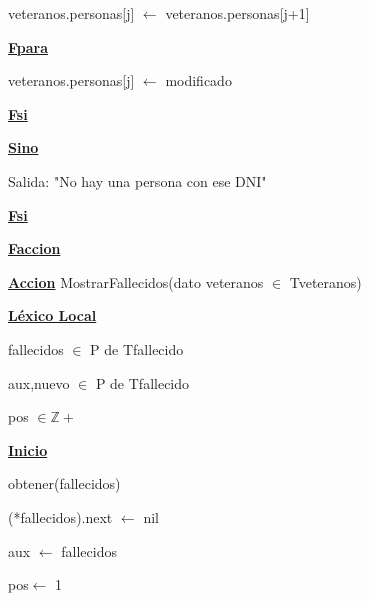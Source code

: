 \documentclass{article}
\begin{document}
                        \hspace{24mm}veteranos.personas[j] $\leftarrow$ veteranos.personas[j+1]

                    \hspace{20mm}\underline{\textbf{Fpara}}
                    
                    \hspace{20mm}veteranos.personas[j] $\leftarrow$ modificado

                \hspace{16mm}\underline{\textbf{Fsi}}

            \hspace{12mm}\underline{\textbf{Sino}}

                \hspace{16mm}Salida: "No hay una persona con ese DNI"

            \hspace{12mm}\underline{\textbf{Fsi}}

    \hspace{4mm}\underline{\textbf{Faccion}}

    \vspace{4mm}

    \hspace{4mm}\underline{\textbf{Accion}} MostrarFallecidos(dato veteranos $\in$ Tveteranos)

        \hspace{8mm}\underline{\textbf{Léxico Local}}

            \hspace{12mm}fallecidos $\in$ P de Tfallecido

            \hspace{12mm}aux,nuevo $\in$ P de Tfallecido

            \hspace{12mm}pos $\in \mathbb{Z}+$

        \hspace{8mm}\underline{\textbf{Inicio}}

            \hspace{12mm}obtener(fallecidos)

            \hspace{12mm}(*fallecidos).next $\leftarrow$ nil

            \hspace{12mm}aux $\leftarrow$ fallecidos

            \hspace{12mm}pos$\leftarrow$ 1
\end{document}
